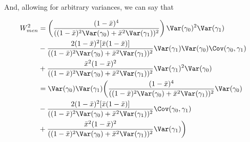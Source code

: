






And, allowing for arbitrary variances, we can say that

\begin{align*}
	W_{men}^2 &= \left(\frac{(1 - \bar{x})^4}{((1-\bar{x})^2 \Var(\gamma_0) + \bar{x}^2 \Var(\gamma_1))^2}\right)\Var(\gamma_0)^2 \Var(\gamma_1)  \\
			  & -  \frac{2 (1 - \bar{x})^2[\bar{x} (1-\bar{x})]}{((1-\bar{x})^2 \Var(\gamma_0) + \bar{x}^2 \Var(\gamma_1))^2} \Var(\gamma_1) \Var(\gamma_0) \Cov(\gamma_0, \gamma_1)  \\
			  & + \frac{\bar{x}^2 (1-\bar{x})^2}{((1-\bar{x})^2 \Var(\gamma_0) + \bar{x}^2 \Var(\gamma_1))^2} \Var(\gamma_1)^2 \Var(\gamma_0) \\
			  &= \Var(\gamma_0) \Var(\gamma_1) \bigg(\frac{(1 - \bar{x})^4}{((1-\bar{x})^2 \Var(\gamma_0) + \bar{x}^2 \Var(\gamma_1))^2}\Var(\gamma_0)  \\
			  & -  \frac{2 (1 - \bar{x})^2[\bar{x} (1-\bar{x})]}{((1-\bar{x})^2 \Var(\gamma_0) + \bar{x}^2 \Var(\gamma_1))^2} \Cov(\gamma_0, \gamma_1)  \\
			  & + \frac{\bar{x}^2 (1-\bar{x})^2}{((1-\bar{x})^2 \Var(\gamma_0) + \bar{x}^2 \Var(\gamma_1))^2} \Var(\gamma_1) \bigg) \\
\end{align*} 



